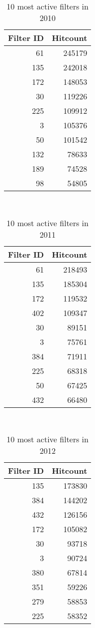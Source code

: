 \begin{table}
  \centering
  \begin{tabular}{r r }
    Filter ID & Hitcount \\
    \hline
    61 & 245179 \\
    135 & 242018 \\
    172 & 148053 \\
    30 & 119226 \\
    225 & 109912 \\
    3 & 105376 \\
    50 & 101542 \\
    132 & 78633 \\
    189 & 74528 \\
    98 & 54805 \\
  \end{tabular}
  \caption{10 most active filters in 2010}~\label{tab:most-active-2010}
\end{table}

\begin{table}
  \centering
  \begin{tabular}{r r }
    Filter ID & Hitcount \\
    \hline
    61 & 218493 \\
    135 & 185304 \\
    172 & 119532 \\
    402 & 109347 \\
    30 & 89151 \\
    3 & 75761 \\
    384 & 71911 \\
    225 & 68318 \\
    50 & 67425 \\
    432 & 66480 \\
  \end{tabular}
  \caption{10 most active filters in 2011}~\label{tab:most-active-2011}
\end{table}

\begin{table}
  \centering
  \begin{tabular}{r r }
    Filter ID & Hitcount \\
    \hline
    135 & 173830 \\
    384 & 144202 \\
    432 & 126156 \\
    172 & 105082 \\
    30 & 93718 \\
    3 & 90724 \\
    380 & 67814 \\
    351 & 59226 \\
    279 & 58853 \\
    225 & 58352 \\
  \end{tabular}
  \caption{10 most active filters in 2012}~\label{tab:most-active-2012}
\end{table}

